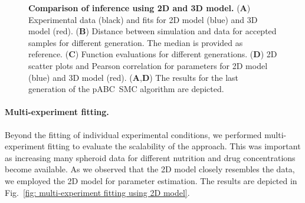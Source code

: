 \documentclass[10pt,letterpaper]{article}
\begin{document}
\begin{figure}[p]
\begin{adjustwidth}{-2in}{0in} %
\caption{{\bf Comparison of inference using 2D and 3D model.}
(\textbf{A}) Experimental data (black) and fits for 2D model (blue) and 3D model (red).
(\textbf{B}) Distance between simulation and data for accepted samples for different generation. The median is provided as reference. 
(\textbf{C}) Function evaluations for different generations.
(\textbf{D}) 2D scatter plots and Pearson correlation for parameters for 2D model (blue) and 3D model (red). 
(\textbf{A},\textbf{D}) The results for the last generation of the pABC~SMC algorithm are depicted.
}
\label{fig: fitting of 2D and 3D model to experimental data for case without nutrition limitation}
\end{adjustwidth}
\end{figure}




\paragraph*{Multi-experiment fitting.}
Beyond the fitting of individual experimental conditions, we performed multi-experiment fitting to evaluate the scalability of the approach. This was important as increasing many spheroid data for different nutrition and drug concentrations become available\cite{KwapiszewskaMic2014}. As we observed that the 2D model closely resembles the data, we employed the 2D model for parameter estimation. The results are depicted in Fig.~\ref{fig: multi-experiment fitting using 2D model}.
\end{document}
